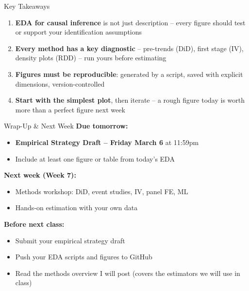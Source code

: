 \begin{frame}{Key Takeaways}
  \begin{enumerate}
    \item \textbf{EDA for causal inference} is not just description -- every figure should test or support your identification assumptions

    \vspace{4pt}

    \item \textbf{Every method has a key diagnostic} -- pre-trends (DiD), first stage (IV), density plots (RDD) -- run yours before estimating

    \vspace{4pt}

    \item \textbf{Figures must be reproducible}: generated by a script, saved with explicit dimensions, version-controlled

    \vspace{4pt}

    \item \textbf{Start with the simplest plot}, then iterate -- a rough figure today is worth more than a perfect figure next week
  \end{enumerate}
\end{frame}

\begin{frame}{Wrap-Up \& Next Week}
  \textbf{Due tomorrow:}
  \begin{itemize}
    \item \textbf{Empirical Strategy Draft -- Friday March 6} at 11:59pm
    \item Include at least one figure or table from today's EDA
  \end{itemize}

  \vspace{8pt}

  \textbf{Next week (Week 7):}
  \begin{itemize}
    \item Methods workshop: DiD, event studies, IV, panel FE, ML
    \item Hands-on estimation with your own data
  \end{itemize}

  \vspace{8pt}

  \textbf{Before next class:}
  \begin{itemize}
    \item Submit your empirical strategy draft
    \item Push your EDA scripts and figures to GitHub
    \item Read the methods overview I will post (covers the estimators we will use in class)
  \end{itemize}
\end{frame}


